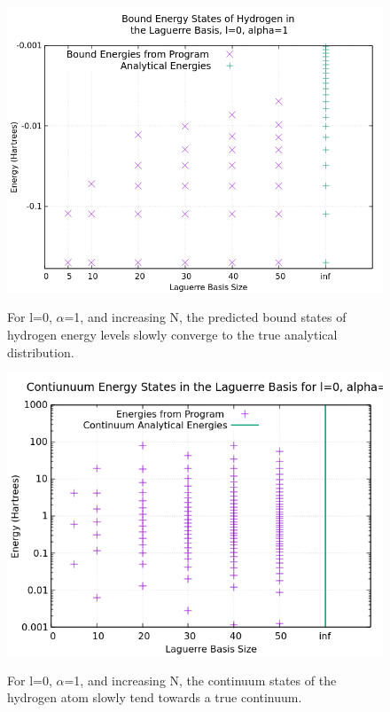 \documentclass{article}
\begin{document}
	\begin{figure}[H]
		\centering
		\includegraphics[scale=0.62]{Images/variedN.png}\\
		\caption{For l=0, $\alpha$=1, and increasing N, the predicted bound states of hydrogen energy levels slowly converge to the true analytical distribution.}
		\label{variedNbound}
	\end{figure}
	\begin{figure}[H]
		\centering
		\includegraphics[scale=0.7]{Images/variedNcont.png}\\
		\caption{For l=0, $\alpha$=1, and increasing N, the continuum states of the hydrogen atom slowly tend towards a true continuum.}
		\label{variedNcont}
	\end{figure}
	
\end{document}
